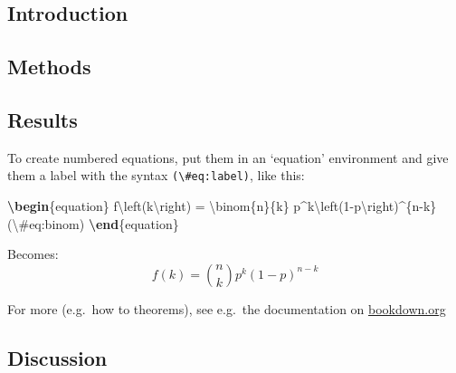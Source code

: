 \documentclass[a4paper,nobind]{templates/ociamthesis}
\newenvironment{Shaded}{\begin{snugshade}}{\end{snugshade}}
\newcommand{\ExtensionTok}[1]{#1}
\newcommand{\KeywordTok}[1]{\textcolor[rgb]{0.13,0.29,0.53}{\textbf{#1}}}
\newcommand{\NormalTok}[1]{#1}
\newcommand{\SpecialCharTok}[1]{\textcolor[rgb]{0.00,0.00,0.00}{#1}}
\newcommand{\SpecialStringTok}[1]{\textcolor[rgb]{0.31,0.60,0.02}{#1}}
\renewenvironment{Shaded}
{
  \vspace{4pt}%
  \begin{snugshade}%
}{%
  \end{snugshade}%
  \vspace{4pt}%
}
\begin{document}
\hypertarget{introduction-1}{%
\subsection{Introduction}\label{introduction-1}}

\hypertarget{methods-2}{%
\subsection{Methods}\label{methods-2}}

\hypertarget{results-2}{%
\subsection{Results}\label{results-2}}

To create numbered equations, put them in an `equation' environment and give them a label with the syntax \texttt{(\textbackslash{}\#eq:label)}, like this:

\begin{Shaded}
\begin{Highlighting}[]
\KeywordTok{\textbackslash{}begin}\NormalTok{\{}\ExtensionTok{equation}\NormalTok{\}}\SpecialStringTok{ }
\SpecialStringTok{  f}\SpecialCharTok{\textbackslash{}left}\SpecialStringTok{(k}\SpecialCharTok{\textbackslash{}right}\SpecialStringTok{) = }\SpecialCharTok{\textbackslash{}binom}\SpecialStringTok{\{n\}\{k\} p\^{}k}\SpecialCharTok{\textbackslash{}left}\SpecialStringTok{(1{-}p}\SpecialCharTok{\textbackslash{}right}\SpecialStringTok{)\^{}\{n{-}k\}}
\SpecialStringTok{  (}\SpecialCharTok{\textbackslash{}\#}\SpecialStringTok{eq:binom)}
\KeywordTok{\textbackslash{}end}\NormalTok{\{}\ExtensionTok{equation}\NormalTok{\} }
\end{Highlighting}
\end{Shaded}

Becomes:
\begin{equation}
f\left(k\right)=\binom{n}{k}p^k\left(1-p\right)^{n-k}
\label{eq:binom}
\end{equation}

For more (e.g.~how to theorems), see e.g.~the documentation on \href{https://bookdown.org/yihui/bookdown/markdown-extensions-by-bookdown.html\#equations}{bookdown.org}

\hypertarget{discussion-2}{%
\subsection{Discussion}\label{discussion-2}}
\end{document}
